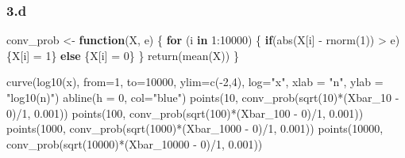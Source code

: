 \documentclass[
]{article}
\newenvironment{Shaded}{\begin{snugshade}}{\end{snugshade}}
\newcommand{\AttributeTok}[1]{\textcolor[rgb]{0.77,0.63,0.00}{#1}}
\newcommand{\ControlFlowTok}[1]{\textcolor[rgb]{0.13,0.29,0.53}{\textbf{#1}}}
\newcommand{\DecValTok}[1]{\textcolor[rgb]{0.00,0.00,0.81}{#1}}
\newcommand{\FloatTok}[1]{\textcolor[rgb]{0.00,0.00,0.81}{#1}}
\newcommand{\FunctionTok}[1]{\textcolor[rgb]{0.00,0.00,0.00}{#1}}
\newcommand{\NormalTok}[1]{#1}
\newcommand{\OtherTok}[1]{\textcolor[rgb]{0.56,0.35,0.01}{#1}}
\newcommand{\SpecialCharTok}[1]{\textcolor[rgb]{0.00,0.00,0.00}{#1}}
\newcommand{\StringTok}[1]{\textcolor[rgb]{0.31,0.60,0.02}{#1}}
\begin{document}
\hypertarget{d-1}{%
\subsubsection{3.d}\label{d-1}}

\begin{Shaded}
\begin{Highlighting}[]
\NormalTok{conv\_prob }\OtherTok{\textless{}{-}} \ControlFlowTok{function}\NormalTok{(X, e) \{}
  \ControlFlowTok{for}\NormalTok{ (i }\ControlFlowTok{in} \DecValTok{1}\SpecialCharTok{:}\DecValTok{10000}\NormalTok{) \{}
    \ControlFlowTok{if}\NormalTok{(}\FunctionTok{abs}\NormalTok{(X[i] }\SpecialCharTok{{-}} \FunctionTok{rnorm}\NormalTok{(}\DecValTok{1}\NormalTok{)) }\SpecialCharTok{\textgreater{}}\NormalTok{ e) \{X[i] }\OtherTok{=} \DecValTok{1}\NormalTok{\}}
    \ControlFlowTok{else}\NormalTok{ \{X[i] }\OtherTok{=} \DecValTok{0}\NormalTok{\}}
\NormalTok{  \}}
\FunctionTok{return}\NormalTok{(}\FunctionTok{mean}\NormalTok{(X))}
\NormalTok{\}}

\FunctionTok{curve}\NormalTok{(}\FunctionTok{log10}\NormalTok{(x), }\AttributeTok{from=}\DecValTok{1}\NormalTok{, }\AttributeTok{to=}\DecValTok{10000}\NormalTok{, }\AttributeTok{ylim=}\FunctionTok{c}\NormalTok{(}\SpecialCharTok{{-}}\DecValTok{2}\NormalTok{,}\DecValTok{4}\NormalTok{), }\AttributeTok{log=}\StringTok{"x"}\NormalTok{, }\AttributeTok{xlab =} \StringTok{"n"}\NormalTok{, }\AttributeTok{ylab =} \StringTok{"log10(n)"}\NormalTok{)}
\FunctionTok{abline}\NormalTok{(}\AttributeTok{h =} \DecValTok{0}\NormalTok{, }\AttributeTok{col=}\StringTok{"blue"}\NormalTok{)}
\FunctionTok{points}\NormalTok{(}\DecValTok{10}\NormalTok{, }\FunctionTok{conv\_prob}\NormalTok{(}\FunctionTok{sqrt}\NormalTok{(}\DecValTok{10}\NormalTok{)}\SpecialCharTok{*}\NormalTok{(Xbar\_10 }\SpecialCharTok{{-}} \DecValTok{0}\NormalTok{)}\SpecialCharTok{/}\DecValTok{1}\NormalTok{, }\FloatTok{0.001}\NormalTok{))}
\FunctionTok{points}\NormalTok{(}\DecValTok{100}\NormalTok{, }\FunctionTok{conv\_prob}\NormalTok{(}\FunctionTok{sqrt}\NormalTok{(}\DecValTok{100}\NormalTok{)}\SpecialCharTok{*}\NormalTok{(Xbar\_100 }\SpecialCharTok{{-}} \DecValTok{0}\NormalTok{)}\SpecialCharTok{/}\DecValTok{1}\NormalTok{, }\FloatTok{0.001}\NormalTok{))}
\FunctionTok{points}\NormalTok{(}\DecValTok{1000}\NormalTok{, }\FunctionTok{conv\_prob}\NormalTok{(}\FunctionTok{sqrt}\NormalTok{(}\DecValTok{1000}\NormalTok{)}\SpecialCharTok{*}\NormalTok{(Xbar\_1000 }\SpecialCharTok{{-}} \DecValTok{0}\NormalTok{)}\SpecialCharTok{/}\DecValTok{1}\NormalTok{, }\FloatTok{0.001}\NormalTok{))}
\FunctionTok{points}\NormalTok{(}\DecValTok{10000}\NormalTok{, }\FunctionTok{conv\_prob}\NormalTok{(}\FunctionTok{sqrt}\NormalTok{(}\DecValTok{10000}\NormalTok{)}\SpecialCharTok{*}\NormalTok{(Xbar\_10000 }\SpecialCharTok{{-}} \DecValTok{0}\NormalTok{)}\SpecialCharTok{/}\DecValTok{1}\NormalTok{, }\FloatTok{0.001}\NormalTok{))}
\end{Highlighting}
\end{Shaded}
\end{document}

